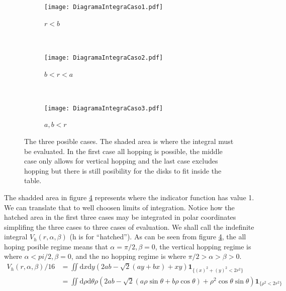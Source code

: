 \documentclass[letterpaper,10pt, jcp, aps]{revtex4-1}
\newcommand{\rd}{\!\mathrm{d}}
\newcommand{\indicator}[1]{\mathbf{1}_{ \{   #1 \} } }
\begin{document}
\begin{figure}[h]
        \centering
        \begin{subfigure}[b]{0.32\textwidth}
          \centering
          \texttt{[image: DiagramaIntegraCaso1.pdf]}
          \caption{$r<b$}
          \label{Caso1}
        \end{subfigure}%
        ~ %
        \begin{subfigure}[b]{0.32\textwidth}
          \centering
          \texttt{[image: DiagramaIntegraCaso2.pdf]}
          \caption{$b<r<a$}
          \label{Caso2}
        \end{subfigure}%
        ~ %
        \begin{subfigure}[b]{0.32\textwidth}
          \centering
          \texttt{[image: DiagramaIntegraCaso3.pdf]}
          \caption{$a,b<r$}
          \label{Caso3}
        \end{subfigure}%
        \caption{The three posible cases. The shaded area is where the integral
          must be evaluated. In the first case all hopping is possible, the middle case
          only allows for vertical hopping and the last case excludes hopping but there
        is still posibility for the disks to fit inside the table.}
\label{CasosIntegra}
\end{figure}
The shadded area in figure \ref{CasosIntegra} represents where the indicator function
has value 1. We can translate that to well choosen limits of integration. Notice
how the hatched area in the first three cases may be integrated in polar coordinates
simplifing the three cases to three cases of evaluation. We shall call the
indefinite integral $V_h(r,\alpha,\beta)$ (h is for ``hatched'').
As can be seen from figure \ref{CasosIntegra}, the all hoping posible regime
means that $\alpha=\pi/2, \beta=0$, the vertical hopping regime is where
$\alpha<pi/2, \beta=0$, and the no hopping regime is where $\pi/2>\alpha>\beta>0$.
\begin{equation}\label{Vhatch1}
\begin{split}
V_h(r,\alpha,\beta)/16 &=\iint \rd x \rd y (2ab-\sqrt{2}(ay+bx)+x y)
\indicator{(x)^2+(y)^2<2r^2 }\\
&=\iint \rd \rho \rd \theta \rho (2ab
-\sqrt{2}(a\rho\sin\theta+b\rho\cos\theta)
+\rho^2 \cos\theta\sin\theta)
\indicator{\rho^2<2r^2 }
\end{split}
\end{equation}
\end{document}
